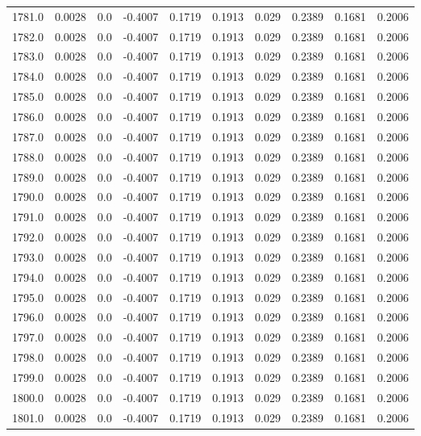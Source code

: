 \begin{longtable}{lrrrrrrrrr}
1781.0 & 0.0028 & 0.0 & -0.4007 & 0.1719 & 0.1913 & 0.029 & 0.2389 & 0.1681 & 0.2006 \\
1782.0 & 0.0028 & 0.0 & -0.4007 & 0.1719 & 0.1913 & 0.029 & 0.2389 & 0.1681 & 0.2006 \\
1783.0 & 0.0028 & 0.0 & -0.4007 & 0.1719 & 0.1913 & 0.029 & 0.2389 & 0.1681 & 0.2006 \\
1784.0 & 0.0028 & 0.0 & -0.4007 & 0.1719 & 0.1913 & 0.029 & 0.2389 & 0.1681 & 0.2006 \\
1785.0 & 0.0028 & 0.0 & -0.4007 & 0.1719 & 0.1913 & 0.029 & 0.2389 & 0.1681 & 0.2006 \\
1786.0 & 0.0028 & 0.0 & -0.4007 & 0.1719 & 0.1913 & 0.029 & 0.2389 & 0.1681 & 0.2006 \\
1787.0 & 0.0028 & 0.0 & -0.4007 & 0.1719 & 0.1913 & 0.029 & 0.2389 & 0.1681 & 0.2006 \\
1788.0 & 0.0028 & 0.0 & -0.4007 & 0.1719 & 0.1913 & 0.029 & 0.2389 & 0.1681 & 0.2006 \\
1789.0 & 0.0028 & 0.0 & -0.4007 & 0.1719 & 0.1913 & 0.029 & 0.2389 & 0.1681 & 0.2006 \\
1790.0 & 0.0028 & 0.0 & -0.4007 & 0.1719 & 0.1913 & 0.029 & 0.2389 & 0.1681 & 0.2006 \\
1791.0 & 0.0028 & 0.0 & -0.4007 & 0.1719 & 0.1913 & 0.029 & 0.2389 & 0.1681 & 0.2006 \\
1792.0 & 0.0028 & 0.0 & -0.4007 & 0.1719 & 0.1913 & 0.029 & 0.2389 & 0.1681 & 0.2006 \\
1793.0 & 0.0028 & 0.0 & -0.4007 & 0.1719 & 0.1913 & 0.029 & 0.2389 & 0.1681 & 0.2006 \\
1794.0 & 0.0028 & 0.0 & -0.4007 & 0.1719 & 0.1913 & 0.029 & 0.2389 & 0.1681 & 0.2006 \\
1795.0 & 0.0028 & 0.0 & -0.4007 & 0.1719 & 0.1913 & 0.029 & 0.2389 & 0.1681 & 0.2006 \\
1796.0 & 0.0028 & 0.0 & -0.4007 & 0.1719 & 0.1913 & 0.029 & 0.2389 & 0.1681 & 0.2006 \\
1797.0 & 0.0028 & 0.0 & -0.4007 & 0.1719 & 0.1913 & 0.029 & 0.2389 & 0.1681 & 0.2006 \\
1798.0 & 0.0028 & 0.0 & -0.4007 & 0.1719 & 0.1913 & 0.029 & 0.2389 & 0.1681 & 0.2006 \\
1799.0 & 0.0028 & 0.0 & -0.4007 & 0.1719 & 0.1913 & 0.029 & 0.2389 & 0.1681 & 0.2006 \\
1800.0 & 0.0028 & 0.0 & -0.4007 & 0.1719 & 0.1913 & 0.029 & 0.2389 & 0.1681 & 0.2006 \\
1801.0 & 0.0028 & 0.0 & -0.4007 & 0.1719 & 0.1913 & 0.029 & 0.2389 & 0.1681 & 0.2006 \\

\end{longtable}
